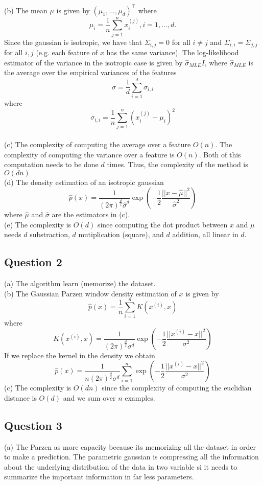 \documentclass[12pt,english]{amsart}
\theoremstyle{definition}
\begin{document}
(b) The mean $\mu$ is given by $(\mu_1,...,\mu_d)^\top$ where
$$
\mu_i = \frac{1}{n}\sum_{j=1}^n x^{(j)}_i, i=1,...,d. 
$$
Since the gaussian is isotropic, we have that $\Sigma_{i,j}=0$ for all $i\neq j$ and $\Sigma_{i,i}=\Sigma_{j,j}$ for all $i, j$ (e.g. each feature of $x$ has the same variance). The log-likelihood estimator of the variance in the isotropic case is given by $\hat{\sigma}_{MLE} I$, where $\hat{\sigma}_{MLE}$ is the average over the empirical variances of the features
$$
\sigma = \frac{1}{d}\sum_{i=1}^d \sigma_{i, i}
$$
where
$$
\sigma_{i, i} = \frac{1}{n}\sum_{j=1}^n (x^{(j)}_i-\mu_i)^2
$$\\

(c) The complexity of computing the average over a feature $O(n)$. The complexity of computing the variance over a feature is $O(n)$. Both of this computation needs to be done $d$ times. Thus, the complexity of the method is $O(dn)$ \\

(d) The density estimation of an isotropic gaussian
$$
    \hat{p}(x)
    = \frac{1}{(2\pi)^\frac{d}{2}\hat{\sigma}^d}
    \exp(-\frac{1}{2}\frac{||x-\hat{\mu}||^2}{\hat{\sigma}^2})
$$
where $\hat{\mu}$ and $\hat{\sigma}$ are the estimators in (c).\\

(e) The complexity is $O(d)$ since computing the dot product between $x$ and $\mu$ needs $d$ substraction, $d$ mutiplication (square), and $d$ addition, all linear in $d$.

\subsection*{Question 2}
(a) The algorithm learn (memorize) the dataset.\\

(b) The Gaussian Parzen window density estimation of $x$ is given by 
$$
    \hat{p}(x) = \frac{1}{n}\sum_{i=1}^n K(x^{(i)}, x)
$$
where 
$$
K(x^{(i)}, x) =
\frac{1}{(2\pi)^\frac{d}{2}\sigma^d}
\exp\left(-\frac{1}{2}\frac{||x^{(i)}-x||^2}{\sigma^2}\right)
$$
If we replace the kernel in the density we obtain
$$
\hat{p}(x) = \frac{1}{n(2\pi)^\frac{d}{2}\sigma^d}\sum_{i=1}^n
\exp\left(-\frac{1}{2}\frac{||x^{(i)}-x||^2}{\sigma^2}\right)
$$
(c) The complexity is $O(dn)$ since the complexity of computing the euclidian distance is $O(d)$ and we sum over $n$ examples. \\

\subsection*{Question 3}
(a) The Parzen  as more capacity because its memorizing all the dataset in order to make a prediction. The parametric gaussian is compressing all the information about the underlying distribution of the data in two variable si it needs to summarize the important information in far less parameters.\\
\end{document}
